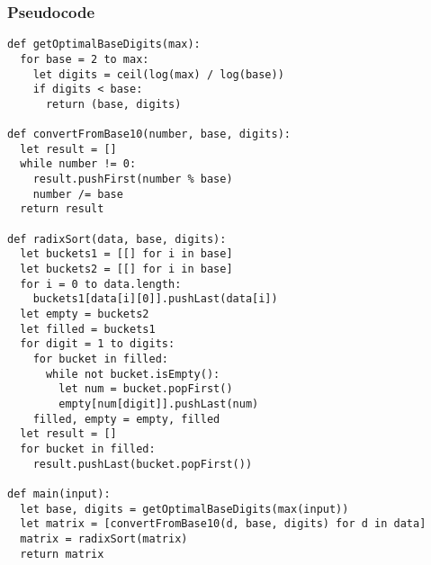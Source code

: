 \documentclass{math}
\begin{document}
\subsubsection*{Pseudocode}
\begin{lstlisting}
def getOptimalBaseDigits(max):
  for base = 2 to max:
    let digits = ceil(log(max) / log(base))
    if digits < base:
      return (base, digits)

def convertFromBase10(number, base, digits):
  let result = []
  while number != 0:
    result.pushFirst(number % base)
    number /= base
  return result

def radixSort(data, base, digits):
  let buckets1 = [[] for i in base]
  let buckets2 = [[] for i in base]
  for i = 0 to data.length:
    buckets1[data[i][0]].pushLast(data[i])
  let empty = buckets2
  let filled = buckets1
  for digit = 1 to digits:
    for bucket in filled:
      while not bucket.isEmpty():
        let num = bucket.popFirst()
        empty[num[digit]].pushLast(num)
    filled, empty = empty, filled
  let result = []
  for bucket in filled:
    result.pushLast(bucket.popFirst())

def main(input):
  let base, digits = getOptimalBaseDigits(max(input))
  let matrix = [convertFromBase10(d, base, digits) for d in data]
  matrix = radixSort(matrix)
  return matrix
\end{lstlisting}
\end{document}
